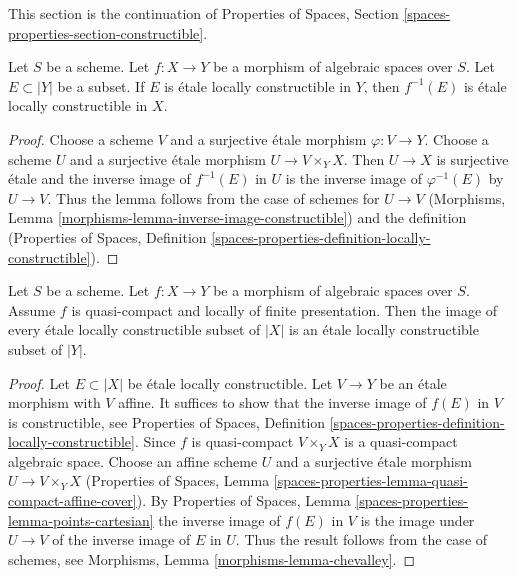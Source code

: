\noindent
This section is the continuation of
Properties of Spaces, Section \ref{spaces-properties-section-constructible}.

\begin{lemma}
\label{lemma-inverse-image-constructible}
Let $S$ be a scheme.
Let $f : X \to Y$ be a morphism of algebraic spaces over $S$.
Let $E \subset |Y|$ be a subset.
If $E$ is \'etale locally constructible in $Y$, then
$f^{-1}(E)$ is \'etale locally constructible in $X$.
\end{lemma}

\begin{proof}
Choose a scheme $V$ and a surjective \'etale morphism $\varphi : V \to Y$.
Choose a scheme $U$ and a surjective \'etale morphism
$U \to V \times_Y X$. Then $U \to X$ is surjective \'etale
and the inverse image of $f^{-1}(E)$ in $U$ is the inverse
image of $\varphi^{-1}(E)$ by $U \to V$. Thus the lemma follows
from the case of schemes for $U \to V$
(Morphisms, Lemma \ref{morphisms-lemma-inverse-image-constructible})
and the definition (Properties of Spaces, Definition
\ref{spaces-properties-definition-locally-constructible}).
\end{proof}

\begin{theorem}
\label{theorem-chevalley}
Let $S$ be a scheme.
Let $f : X \to Y$ be a morphism of algebraic spaces over $S$.
Assume $f$ is quasi-compact and locally of finite presentation.
Then the image of every \'etale locally constructible subset of $|X|$ is
an \'etale locally constructible subset of $|Y|$.
\end{theorem}

\begin{proof}
Let $E \subset |X|$ be \'etale locally constructible.
Let $V \to Y$ be an \'etale morphism with $V$ affine.
It suffices to show that the inverse image of $f(E)$ in
$V$ is constructible, see Properties of Spaces, Definition
\ref{spaces-properties-definition-locally-constructible}.
Since $f$ is quasi-compact $V \times_Y X$ is a quasi-compact algebraic space.
Choose an affine scheme $U$ and a surjective \'etale morphism
$U \to V \times_Y X$ (Properties of Spaces, Lemma
\ref{spaces-properties-lemma-quasi-compact-affine-cover}).
By Properties of Spaces, Lemma \ref{spaces-properties-lemma-points-cartesian}
the inverse image of $f(E)$ in $V$ is the image under $U \to V$
of the inverse image of $E$ in $U$.
Thus the result follows from the case of schemes, see
Morphisms, Lemma \ref{morphisms-lemma-chevalley}.
\end{proof}







